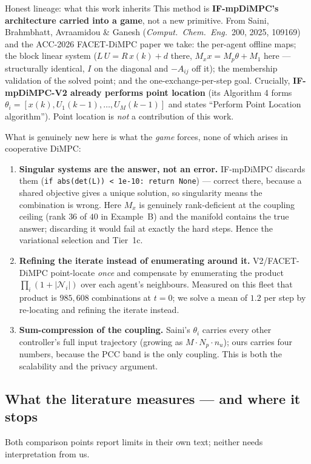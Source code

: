\documentclass[11pt, letterpaper]{article}
\begin{document}
\begin{keybox}{Honest lineage: what this work inherits}
This method is \textbf{IF-mpDiMPC's architecture carried into a game}, not a new primitive. From
Saini, Brahmbhatt, Avraamidou \& Ganesh (\emph{Comput.\ Chem.\ Eng.}\ 200, 2025, 109169) and the
ACC-2026 FACET-DiMPC paper we take: the per-agent offline maps; the block linear system
($L\,U=R\,x(k)+d$ there, $M_xx=M_p\theta+M_1$ here --- structurally identical, $I$ on the diagonal and
$-A_{ij}$ off it); the membership validation of the solved point; and the one-exchange-per-step goal.
Crucially, \textbf{IF-mpDiMPC-V2 already performs point location} (its Algorithm 4 forms
$\theta_i=[x(k),U_1(k-1),\dots,U_M(k-1)]$ and states ``Perform Point Location algorithm''). Point
location is \emph{not} a contribution of this work.

What is genuinely new here is what the \emph{game} forces, none of which arises in cooperative DiMPC:
\begin{enumerate}[leftmargin=1.6em,nosep]
\item \textbf{Singular systems are the answer, not an error.} IF-mpDiMPC discards them
(\texttt{if abs(det(L)) < 1e-10: return None}) --- correct there, because a shared objective gives a
unique solution, so singularity means the combination is wrong. Here $M_x$ is genuinely rank-deficient
at the coupling ceiling (rank $36$ of $40$ in Example~B) and the manifold contains the true answer;
discarding it would fail at exactly the hard steps. Hence the variational selection and Tier~1c.
\item \textbf{Refining the iterate instead of enumerating around it.} V2/FACET-DiMPC point-locate
\emph{once} and compensate by enumerating the product $\prod_i(1+|\mathcal N_i|)$ over each agent's
neighbours. Measured on this fleet that product is $985{,}608$ combinations at $t{=}0$; we solve a
mean of $1.2$ per step by re-locating and refining the iterate instead.
\item \textbf{Sum-compression of the coupling.} Saini's $\theta_i$ carries every other controller's
full input trajectory (growing as $M\!\cdot\!N_p\!\cdot\!n_u$); ours carries four numbers, because the
PCC band is the only coupling. This is both the scalability and the privacy argument.
\end{enumerate}
\end{keybox}

\subsection{What the literature measures --- and where it stops}
Both comparison points report limits in their own text; neither needs interpretation from us.
\end{document}
